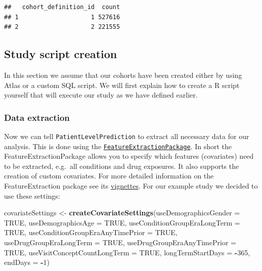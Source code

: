 \documentclass[]{article}
\newenvironment{Shaded}{\begin{snugshade}}{\end{snugshade}}
\newcommand{\KeywordTok}[1]{\textcolor[rgb]{0.13,0.29,0.53}{\textbf{#1}}}
\newcommand{\DataTypeTok}[1]{\textcolor[rgb]{0.13,0.29,0.53}{#1}}
\newcommand{\DecValTok}[1]{\textcolor[rgb]{0.00,0.00,0.81}{#1}}
\newcommand{\StringTok}[1]{\textcolor[rgb]{0.31,0.60,0.02}{#1}}
\newcommand{\OtherTok}[1]{\textcolor[rgb]{0.56,0.35,0.01}{#1}}
\newcommand{\OperatorTok}[1]{\textcolor[rgb]{0.81,0.36,0.00}{\textbf{#1}}}
\newcommand{\NormalTok}[1]{#1}
\begin{document}
\begin{verbatim}
##   cohort_definition_id  count
## 1                    1 527616
## 2                    2 221555
\end{verbatim}

\subsection{Study script creation}\label{study-script-creation}

In this section we assume that our cohorts have been created either by
using Atlas or a custom SQL script. We will first explain how to create
a R script yourself that will execute our study as we have defined
earlier.

\subsubsection{Data extraction}\label{data-extraction}

Now we can tell \texttt{PatientLevelPrediction} to extract all necessary
data for our analysis. This is done using the
\href{https://github.com/OHDSI/FeatureExtration}{\texttt{FeatureExtractionPackage}}.
In short the FeatureExtractionPackage allows you to specify which
features (covariates) need to be extracted, e.g.~all conditions and drug
exposures. It also supports the creation of custom covariates. For more
detailed information on the FeatureExtraction package see its
\href{https://github.com/OHDSI/FeatureExtration}{vignettes}. For our
example study we decided to use these settings:

\begin{Shaded}
\begin{Highlighting}[]
\NormalTok{covariateSettings <-}\StringTok{ }\KeywordTok{createCovariateSettings}\NormalTok{(}\DataTypeTok{useDemographicsGender =} \OtherTok{TRUE}\NormalTok{,}
                                             \DataTypeTok{useDemographicsAge =} \OtherTok{TRUE}\NormalTok{,}
                                             \DataTypeTok{useConditionGroupEraLongTerm =} \OtherTok{TRUE}\NormalTok{,}
                                             \DataTypeTok{useConditionGroupEraAnyTimePrior =} \OtherTok{TRUE}\NormalTok{,}
                                             \DataTypeTok{useDrugGroupEraLongTerm =} \OtherTok{TRUE}\NormalTok{,}
                                             \DataTypeTok{useDrugGroupEraAnyTimePrior =} \OtherTok{TRUE}\NormalTok{,}
                                             \DataTypeTok{useVisitConceptCountLongTerm =} \OtherTok{TRUE}\NormalTok{,}
                                             \DataTypeTok{longTermStartDays =} \OperatorTok{-}\DecValTok{365}\NormalTok{,}
                                             \DataTypeTok{endDays =} \OperatorTok{-}\DecValTok{1}\NormalTok{)}
\end{Highlighting}
\end{Shaded}
\end{document}
